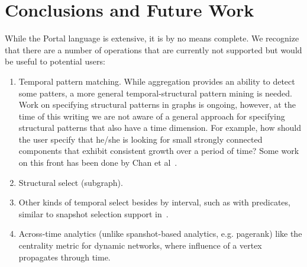 \section{Conclusions and Future Work}
\label{sec:conc}

While the Portal language is extensive, it is by no means complete. We
recognize that there are a number of operations that are currently not
supported but would be useful to potential users:

\begin{enumerate}
\item Temporal pattern matching.  While aggregation provides an
  ability to detect some patters, a more general temporal-structural
  pattern mining is needed.  Work on specifying structural patterns in
  graphs is ongoing, however, at the time of this writing we are not
  aware of a general approach for specifying structural patterns that
  also have a time dimension.  For example, how should the user
  specify that he/she is looking for small strongly connected
  components that exhibit consistent growth over a period of time?
  Some work on this front has been done by Chan et
  al~\cite{Chan2008,Kan2009}.
\item Structural select (subgraph).  
\item Other kinds of temporal select besides by interval, such as with
  predicates, similar to snapshot selection support
  in~\cite{Khurana2013}. 
\item Across-time analytics (unlike spanshot-based analytics,
  e.g. pagerank) like the centrality metric for dynamic networks,
  where influence of a vertex propagates through time.
\end{enumerate}

